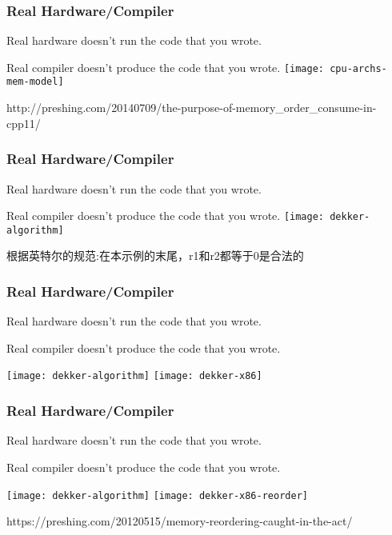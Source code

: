 \begin{frame}
    \frametitle{Real Hardware/Compiler}
    Real hardware doesn’t run the code that you wrote.
    
    Real compiler doesn’t produce the code that you wrote.
    \texttt{[image: cpu-archs-mem-model]}
    
        \tiny
    http://preshing.com/20140709/the-purpose-of-memory\_order\_consume-in-cpp11/
    
\end{frame}

\begin{frame}
    \frametitle{Real Hardware/Compiler}
    Real hardware doesn’t run the code that you wrote.
    
    Real compiler doesn’t produce the code that you wrote.
    \texttt{[image: dekker-algorithm]}
    
    根据英特尔的规范:在本示例的末尾，r1和r2都等于0是合法的
\end{frame}

\begin{frame}
    \frametitle{Real Hardware/Compiler}
    Real hardware doesn’t run the code that you wrote.
    
    Real compiler doesn’t produce the code that you wrote.
    
    \centering
    \texttt{[image: dekker-algorithm]}
    \texttt{[image: dekker-x86]}
\end{frame}

\begin{frame}
    \frametitle{Real Hardware/Compiler}
    Real hardware doesn’t run the code that you wrote.
    
    Real compiler doesn’t produce the code that you wrote.
    
    \centering
    \texttt{[image: dekker-algorithm]}
    \texttt{[image: dekker-x86-reorder]}
    
    \tiny
    https://preshing.com/20120515/memory-reordering-caught-in-the-act/
\end{frame}

